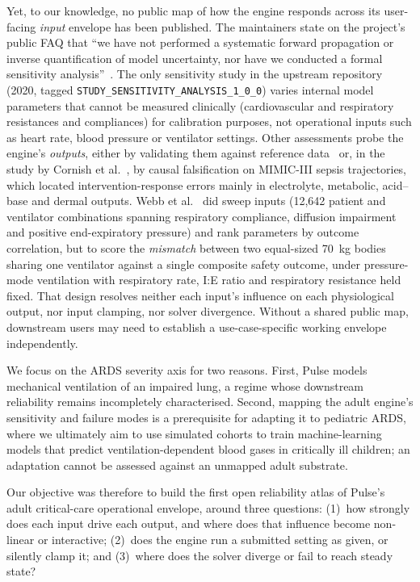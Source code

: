 \documentclass[pdflatex,sn-nature]{sn-jnl}%
\begin{document}
Yet, to our knowledge, no public map of how the engine responds across its user-facing \emph{input} envelope has been published. The maintainers state on the project's public FAQ that ``we have not performed a systematic forward propagation or inverse quantification of model uncertainty, nor have we conducted a formal sensitivity analysis''~\cite{pulsefaq}. The only sensitivity study in the upstream repository (2020, tagged \texttt{STUDY\_SENSITIVITY\_ANALYSIS\_1\_0\_0}) varies internal model parameters that cannot be measured clinically (cardiovascular and respiratory resistances and compliances) for calibration purposes, not operational inputs such as heart rate, blood pressure or ventilator settings. Other assessments probe the engine's \emph{outputs}, either by validating them against reference data~\cite{webb2022vent} or, in the study by Cornish et al.~\cite{cornish2023}, by causal falsification on MIMIC-III sepsis trajectories, which located intervention-response errors mainly in electrolyte, metabolic, acid--base and dermal outputs. Webb et al.~\cite{webb2020} did sweep inputs (12{,}642 patient and ventilator combinations spanning respiratory compliance, diffusion impairment and positive end-expiratory pressure) and rank parameters by outcome correlation, but to score the \emph{mismatch} between two equal-sized 70~kg bodies sharing one ventilator against a single composite safety outcome, under pressure-mode ventilation with respiratory rate, I:E ratio and respiratory resistance held fixed. That design resolves neither each input's influence on each physiological output, nor input clamping, nor solver divergence. Without a shared public map, downstream users may need to establish a use-case-specific working envelope independently.

We focus on the ARDS severity axis for two reasons. First, Pulse models mechanical ventilation of an impaired lung, a regime whose downstream reliability remains incompletely characterised. Second, mapping the adult engine's sensitivity and failure modes is a prerequisite for adapting it to pediatric ARDS, where we ultimately aim to use simulated cohorts to train machine-learning models that predict ventilation-dependent blood gases in critically ill children; an adaptation cannot be assessed against an unmapped adult substrate.

Our objective was therefore to build the first open reliability atlas of Pulse's adult critical-care operational envelope, around three questions: (1)~how strongly does each input drive each output, and where does that influence become non-linear or interactive; (2)~does the engine run a submitted setting as given, or silently clamp it; and (3)~where does the solver diverge or fail to reach steady state?
\end{document}
